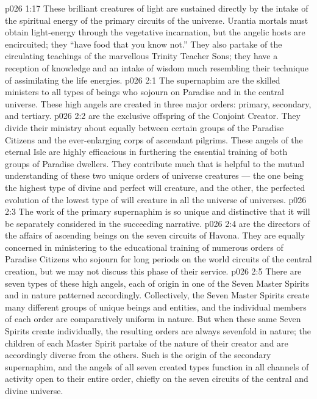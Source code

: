 \vs p026 1:17 These brilliant creatures of light are sustained directly by the intake of the spiritual energy of the primary circuits of the universe. Urantia mortals must obtain light\hyp{}energy through the vegetative incarnation, but the angelic hosts are encircuited; they “have food that you know not.” They also partake of the circulating teachings of the marvellous Trinity Teacher Sons; they have a reception of knowledge and an intake of wisdom much resembling their technique of assimilating the life energies.
\vs p026 2:1 The supernaphim are the skilled ministers to all types of beings who sojourn on Paradise and in the central universe. These high angels are created in three major orders: primary, secondary, and tertiary.
\vs p026 2:2 \pc {} are the exclusive offspring of the Conjoint Creator. They divide their ministry about equally between certain groups of the Paradise Citizens and the ever\hyp{}enlarging corps of ascendant pilgrims. These angels of the eternal Isle are highly efficacious in furthering the essential training of both groups of Paradise dwellers. They contribute much that is helpful to the mutual understanding of these two unique orders of universe creatures --- the one being the highest type of divine and perfect will creature, and the other, the perfected evolution of the lowest type of will creature in all the universe of universes.
\vs p026 2:3 \pc The work of the primary supernaphim is so unique and distinctive that it will be separately considered in the succeeding narrative.
\vs p026 2:4 \pc {} are the directors of the affairs of ascending beings on the seven circuits of Havona. They are equally concerned in ministering to the educational training of numerous orders of Paradise Citizens who sojourn for long periods on the world circuits of the central creation, but we may not discuss this phase of their service.
\vs p026 2:5 \pc There are seven types of these high angels, each of origin in one of the Seven Master Spirits and in nature patterned accordingly. Collectively, the Seven Master Spirits create many different groups of unique beings and entities, and the individual members of each order are comparatively uniform in nature. But when these same Seven Spirits create individually, the resulting orders are always sevenfold in nature; the children of each Master Spirit partake of the nature of their creator and are accordingly diverse from the others. Such is the origin of the secondary supernaphim, and the angels of all seven created types function in all channels of activity open to their entire order, chiefly on the seven circuits of the central and divine universe.
